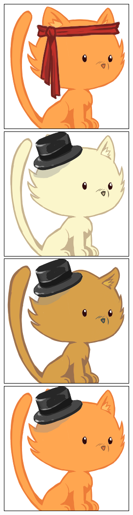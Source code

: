 \documentclass[a4paper, 12pt]{article}
\begin{document}
  \includegraphics[scale=0.45]{out/21.png}
  \includegraphics[scale=0.45]{out/22.png}
  \includegraphics[scale=0.45]{out/23.png}
  \includegraphics[scale=0.45]{out/24.png}
\end{document}
